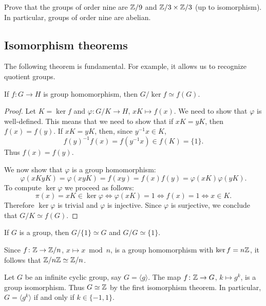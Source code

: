 \begin{exercise}
\label{xca:size9}
Prove that the groups of order nine are 
$\mathbb{Z}/9$ and $\mathbb{Z}/3\times\mathbb{Z}/3$ (up to isomorphism). In particular, groups of order
nine are abelian. 
\end{exercise}

\subsection{Isomorphism theorems}

The following theorem is fundamental. For example, it allows us to recognize quotient groups. 

\begin{theorem}
If $f\colon G\to H$ is group homomorphism, then $G/\ker f\simeq f(G)$.
\end{theorem}

\begin{proof}
    Let $K=\ker f$ and $\varphi\colon G/K\to H$, $xK\mapsto f(x)$. We need to show that $\varphi$ is well-defined. This means that
    we need to show that if $xK=yK$, then $f(x)=f(y)$. If $xK=yK$, then, since $y^{-1}x\in K$, 
    \[
        f(y)^{-1}f(x)=f(y^{-1}x)\in f(K)=\{1\}.
    \]
    Thus $f(x)=f(y)$.

    We now show that $\varphi$ is a group homomorphism: 
        \[
        \varphi(xKyK)=\varphi(xyK)=f(xy)=f(x)f(y)=\varphi(xK)\varphi(yK).
        \]
    To compute $\ker\varphi$ we proceed as follows: 
        \[
        \pi(x)=xK\in\ker\varphi\Longleftrightarrow \varphi(xK)=1
        \Longleftrightarrow f(x)=1
        \Longleftrightarrow x\in K.
        \]
    Therefore  $\ker\varphi$ is trivial and
    $\varphi$ is injective. Since $\varphi$ is surjective, 
    we conclude that $G/K\simeq f(G)$.
\end{proof}

If $G$ is a group, then $G/\{1\}\simeq G$ and $G/G\simeq\{1\}$.

\begin{example}
Since $f\colon\mathbb{Z}\to\mathbb{Z}/n$, $x\mapsto x\bmod n$, is a group homomorphism
with $\ker f=n\mathbb{Z}$, it follows that 
$\mathbb{Z}/n\mathbb{Z}\simeq\mathbb{Z}/n$.
\end{example}

\begin{example}
Let $G$ be an infinite cyclic group, say $G=\langle g\rangle$. The map 
$f \colon\mathbb{Z}\to G$, $k\mapsto g^k$,
is a group isomorphism. Thus $G\simeq\mathbb{Z}$ by the first isomorphism theorem. In particular, $G=\langle g^k\rangle$ if and only if 
 $k\in\{-1,1\}$.
\end{example}

